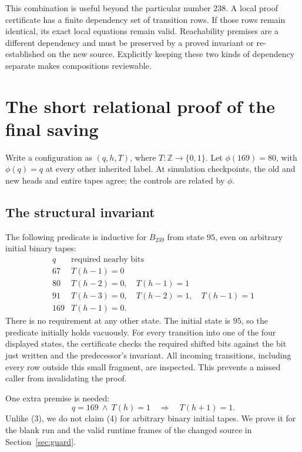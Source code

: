 \documentclass[11pt]{article}
\theoremstyle{definition}\newtheorem{definition}[theorem]{Definition}
\newcommand{\bits}{\{0,1\}}
\begin{document}
This combination is useful beyond the particular number 238.  A local
proof certificate has a finite dependency set of transition rows.  If those
rows remain identical, its exact local equations remain valid.  Reachability
premises are a different dependency and must be preserved by a proved
invariant or re-established on the new source.  Explicitly keeping these
two kinds of dependency separate makes compositions reviewable.

\section{The short relational proof of the final saving}
\label{sec:local}

Write a configuration as $(q,h,T)$, where $T:\mathbb Z\to\bits$.
Let $\phi(169)=80$, with $\phi(q)=q$ at every other inherited label.
At simulation checkpoints, the old and new heads and entire tapes agree;
the controls are related by $\phi$.

\subsection{The structural invariant}

The following predicate is inductive for $B_{239}$ from state $95$, even
on arbitrary initial binary tapes:
\[
\begin{array}{c|l}
q & \text{required nearby bits}\\\hline
67 & T(h-1)=0\\
80 & T(h-2)=0,\quad T(h-1)=1\\
91 & T(h-3)=0,\quad T(h-2)=1,\quad T(h-1)=1\\
169& T(h-1)=0.
\end{array}
\tag{3}
\]
There is no requirement at any other state.  The initial state is $95$,
so the predicate initially holds vacuously.  For every transition into one
of the four displayed states, the certificate checks the required shifted
bits against the bit just written and the predecessor's invariant.
All incoming transitions, including every row outside this small fragment,
are inspected.  This prevents a missed caller from invalidating the proof.

One extra premise is needed:
\[
 q=169\ \wedge\ T(h)=1\quad\Longrightarrow\quad T(h+1)=1.
 \tag{4}
\]
Unlike (3), we do not claim (4) for arbitrary binary initial tapes.  We
prove it for the blank run and the valid runtime frames of the changed
source in Section~\ref{sec:guard}.
\end{document}
